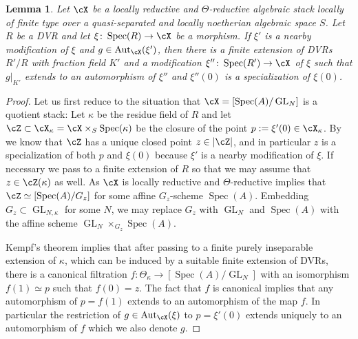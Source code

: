 \documentclass[a4paper]{amsart}
\numberwithin{equation}{section}
\theoremstyle{plain}
\newtheorem{lem}[thm]{Lemma}
\theoremstyle{definition}
\DeclareMathOperator{\Spec}{Spec}
\DeclareMathOperator{\GL}{GL}
\DeclareMathOperator{\Aut}{Aut}
\newcommand{\co}{\colon}
\begin{document}
\begin{lem} \label{L:specializing_modification}  Let $\cX$ be a locally reductive and $\Theta$-reductive algebraic stack locally of finite type over a quasi-separated and locally noetherian algebraic space $S$.
	Let $R$ be a DVR and let $\xi \co\Spec(R) \to \cX$ be a morphism. If $\xi'$ is a nearby modification of $\xi$ and $g \in \Aut_\cX(\xi')$, then there is a finite extension of DVRs $R' / R$ with fraction field $K'$ and a modification $\xi'' \co \Spec(R') \to \cX$ of $\xi$ such that $g|_{K'}$ extends to an automorphism of $\xi''$ and $\xi''(0)$ is a specialization of $\xi(0)$.
\end{lem}

\begin{proof}
Let us first reduce to the situation that $\cX=[\Spec(A)/\GL_N]$ is a quotient stack:   Let $\kappa$ be the residue field of $R$ and let $\cZ \subset \cX_{\kappa} = \cX \times_S \Spec(\kappa)$ be the closure of the point $p:= \xi'(0) \in \cX_{\kappa}$. By  we know that $\cZ$ has a unique closed point $z \in |\cZ|$, and in particular $z$ is a specialization of both $p$ and $\xi(0)$ because $\xi'$ is a nearby modification of $\xi$. If necessary we pass to a finite extension of $R$ so that we may assume that $z \in \cZ(\kappa)$ as well. As $\cX$ is locally reductive and $\Theta$-reductive  implies that $\cZ \simeq [\Spec(A) / G_{z}]$ for some affine $G_{z}$-scheme $\Spec(A)$. Embedding $G_z \subset \GL_{N,\kappa}$ for some $N$, we may replace $G_z$ with $\GL_N$ and $\Spec(A)$ with the affine scheme $\GL_N \times_{G_z} \Spec(A)$.

Kempf's theorem \cite[Theorem 4.2]{kempf1978instability} implies that after passing to a finite purely inseparable extension of $\kappa$, which can be induced by a suitable finite extension of DVRs, 
there is a canonical filtration $f\co \Theta_{\kappa} \to [\Spec(A)/\GL_N]$ with an isomorphism $f(1) \simeq p$ such that $f(0) = z$. The fact that $f$ is canonical implies that any automorphism of $p = f(1)$ extends to an automorphism of the map $f$. In particular the restriction of $g \in \Aut_\cX(\xi)$ to $p = \xi'(0)$ extends uniquely to an automorphism of $f$ which we also denote $g$.


\end{proof}
\end{document}
